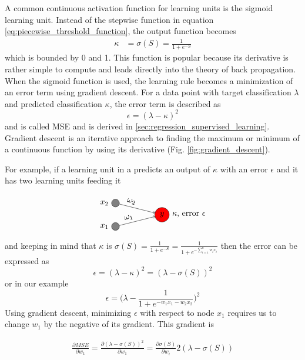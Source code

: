 A common continuous activation function for learning units is the sigmoid learning unit. Instead of the stepwise function in equation \ref{eq:piecewise_threshold_function}, the output function becomes
\begin{align}
  \kappa &= \sigma(S) = \frac{1}{1+e^{-S}}
\end{align}
which is bounded by 0 and 1. This function is popular because its derivative is rather simple to compute and leads directly into the theory of back propagation. When the sigmoid function is used, the learning rule becomes a minimization of an error term using gradient descent. For a data point with target classification $\lambda$ and predicted classification $\kappa$, the error term is described as
$$ \epsilon = (\lambda- \kappa)^2 $$
and is called MSE and is derived in \ref{sec:regression_supervised_learning}. Gradient descent is an iterative approach to finding the maximum or minimum of a continuous function by using its derivative (Fig. \ref{fig:gradient_descent}).


For example, if a learning unit in a predicts an output of $\kappa$ with an error $\epsilon$ and it has two learning units feeding it


\begin{align*}
  \begin{tikzpicture}
    [   cnode/.style={draw=black,fill=#1,minimum width=3mm,circle},
    ]
        \node[cnode=red,label=0:{$\kappa$, error $\epsilon$}] (s) at (2,-1.5) {$y$};
        \foreach \x in {1,...,2}
        {   \pgfmathparse{\x}
            \node[cnode=gray,label=180:$x_{\pgfmathresult}$] (x-\x) at (0,\x-3) {};
            \draw[->] (x-\x) -- node[above,sloped,pos=0.3] {$\omega_{\pgfmathresult}$} (s);
        }
  \end{tikzpicture}
\end{align*}
and keeping in mind that $\kappa$ is $\sigma(S) = \frac{1}{1+e^{-S}} = \frac{1}{1+e^{-\sum_{i=1}^n w_ix_i}}$ then the error can be expressed as 
$$ \epsilon = (\lambda - \kappa)^2  =  (\lambda - \sigma(S))^2$$ 
or in our example  
$$ \epsilon = \Big(\lambda - \frac{1}{1+e^{-w_1x_1-w_2x_2}}\Big)^2$$
Using gradient descent, minimizing $\epsilon$ with respect to node $x_1$ requires us to change $w_1$ by the negative of its gradient. This gradient is 

\begin{align}
  \frac{\partial MSE}{\partial w_1} = \frac{\partial(\lambda - \sigma(S))^2}{\partial w_1}  = \frac{\partial\sigma(S)}{\partial w_i}2(\lambda - \sigma(S))
  \label{eq:gradient_descent_on_sigma}
\end{align}


